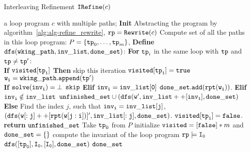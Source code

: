 

  \begin{algorithm}
    \caption{
    {Interleaving Refinement $\mathtt{IRefine}(c)$}
    }
    \label{alg:prog-refine}
    \begin{algorithmic}[1]
    \REQUIRE a loop program $c$ with multiple paths;
    \STATE  \textbf{Init} 
    \STATE Abstracting the program by algorithm~\ref{alg:alg-refine_rewrite},  $\mathtt{rp} = \mathtt{Rewrite}(c)$
    \STATE  Compute set of all the paths in this loop program:
    $P = \{\mathtt{tp}_0, \ldots, \mathtt{tp}_m\}$,
    \STATE \textbf{Define} {$\mathtt{dfs(wking\_path, inv\_list, done\_set)}$:}
    \STATE {}
    \STATE {}
    \STATE \quad \textbf{For} $\mathtt{tp}_i$ in the same loop with $\mathtt{tp}$ and $\mathtt{tp} \neq \mathtt{tp}'$:
    \\
    \STATE \quad \quad \textbf{If} {$\mathtt{visited[\mathtt{tp}_i]}$} \textbf{Then} skip this iteration
    \STATE \quad \quad $\mathtt{visited[\mathtt{tp}_i]} = \mathtt{true}$
    \STATE \quad \quad $\mathtt{w_i = wking\_path.append(\mathtt{tp}')}$
    \\
    \quad {}
    \STATE \quad \quad \textbf{If} {$\mathtt{solve(inv_i) = \bot}$} $\mathtt{skip}$
    \STATE \quad \quad \textbf{Elif} {$\mathtt{inv_i = inv\_list[0]}$} $\mathtt{done\_set.add(\mathtt{rpt}(w_i))}$.
    \STATE \quad \quad \textbf{Elif} {$\mathtt{inv_i \notin inv\_list}$} 
    $\mathtt{unfinished\_set \cup (dfs(w', inv\_list++[inv_i], done\_set)}$
    \STATE \quad \quad \textbf{Else} 
    Find the index $j$, such that $\mathtt{inv_i = inv\_list[j] }$,
    \STATE \quad \quad \quad
    $\mathtt{(dfs(w[:j]++[\mathtt{rpt}(w[j:i])]', inv\_list[:j], done\_set)}$.
    \STATE \quad \quad $\mathtt{visited[\mathtt{tp}_i]} = \mathtt{false}$.
    \STATE \quad \textbf{return} $\mathtt{unfinished\_set}$
    \STATE Take $\mathtt{tp}_0$ from $P$ 
    \STATE initialize $\mathtt{visited} = [\mathtt{false}]*m$ and $\mathtt{done\_set = \{\}}$
    \STATE compute the invariant of the loop program $\mathtt{rp} \models \mathtt{I_0}$
    \STATE $\mathtt{dfs([\mathtt{tp}_0], I_0, [I_0], done\_set )}$
    \RETURN $\mathtt{done\_set}$
    \end{algorithmic}
    \end{algorithm}


